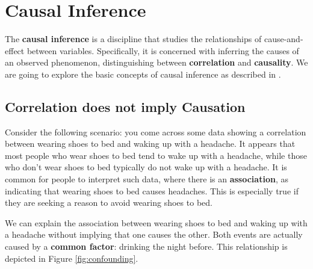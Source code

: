 \section{Causal Inference}

The \textbf{causal inference} is a discipline that studies the relationships
of cause-and-effect between variables. Specifically, it is concerned with inferring
the causes of an observed phenomenon,
distinguishing between \textbf{correlation} and \textbf{causality}.
We are going to explore the basic concepts of causal inference
as described in \cite{Neal_2020a}.

\subsection{Correlation does not imply Causation}

Consider the following scenario: you come across some data showing a correlation
between wearing shoes to bed and waking up with a headache.
It appears that most people who wear shoes to bed tend to wake up
with a headache, while those who don’t wear shoes to bed typically
do not wake up with a headache.
It is common for people to interpret such data,
where there is an \textbf{association},
as indicating that wearing shoes
to bed causes headaches. This is especially true if they are
seeking a reason to avoid wearing shoes to bed.

We can explain the association between wearing shoes to bed and waking
up with a headache without implying that one causes the other.
Both events are actually caused by a \textbf{common factor}:
drinking the night before. This relationship is depicted
in Figure \ref{fig:confounding}.

